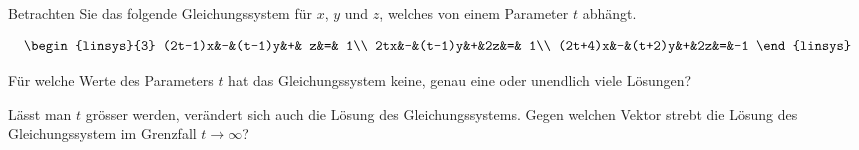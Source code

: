 Betrachten Sie das folgende Gleichungssystem für $x$, $y$ und $z$, 
welches von einem Parameter $t$ abhängt.

\[
\begin{linsys}{3}
(2t-1)x&-&(t-1)y&+& z&=& 1\\
    2tx&-&(t-1)y&+&2z&=& 1\\
(2t+4)x&-&(t+2)y&+&2z&=&-1
\end{linsys}
\]
\begin{teilaufgaben}
\item
Für welche Werte des Parameters $t$ hat das Gleichungssystem
keine, genau eine oder unendlich viele Lösungen?
\item
Lässt man $t$ grösser werden, verändert sich auch die Lösung
des Gleichungssystems. Gegen welchen Vektor strebt die Lösung
des Gleichungssystem im Grenzfall $t\to\infty$?
\end{teilaufgaben}


